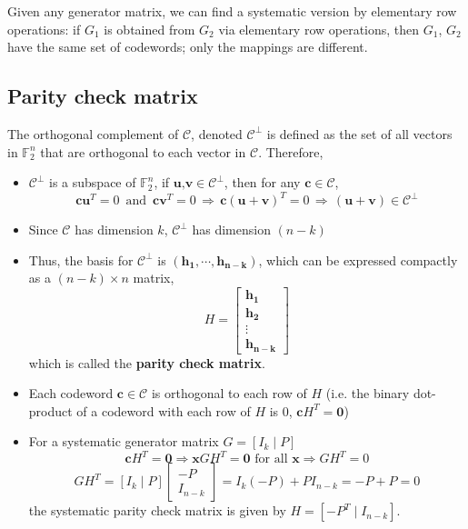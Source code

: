 \documentclass[11pt]{article}
\begin{document}
Given any generator matrix, we can find a systematic version by elementary row operations: if $G_1$ is obtained from $G_2$ via elementary row operations, then
$G_1$, $G_2$ have the same set of codewords; only the mappings are different.

\subsection{Parity check matrix}

The orthogonal complement of $\mathcal{C}$, denoted $\mathcal{C}^\perp$ is defined as the set of all vectors in $\mathbb{F}_2^n$ that are orthogonal to each vector in $\mathcal{C}$. Therefore,
\begin{itemize}
  \item $\mathcal{C}^\perp$ is a subspace of $\mathbb{F}_2^n$, if $\boldsymbol{u} \text{,} \boldsymbol{v} \in \mathcal{C}^\perp$, then for any $\boldsymbol{c} \in \mathcal{C}$,
  \[
  \boldsymbol{c}\boldsymbol{u}^T = 0 \, \text{ and } \, \boldsymbol{c}\boldsymbol{v}^T = 0 \, \Rightarrow \, \boldsymbol{c}(\boldsymbol{u} + \boldsymbol{v})^T = 0 \, \Rightarrow \, (\boldsymbol{u} + \boldsymbol{v}) \in \mathcal{C}^\perp
  \]
  \item Since $\mathcal{C}$ has dimension $k$, $\mathcal{C}^\perp$ has dimension $(n - k)$ 
  \item Thus, the basis for $\mathcal{C}^\perp$ is $(\boldsymbol{h_1}, \cdots, \boldsymbol{h_{n-k}})$, which can be expressed compactly as a $(n-k) \times n$ matrix,
  \[
  H = \left[ \begin{matrix} \boldsymbol{h_1} \\ \boldsymbol{h_2} \\ \vdots \\ \boldsymbol{h_{n-k}} \end{matrix} \right]
  \]
  which is called the \textbf{parity check matrix}.
  \item Each codeword $\boldsymbol{c} \in \mathcal{C}$ is orthogonal to each row of $H$ (i.e. the binary dot-product of a codeword with each row of $H$ is $0$, $\boldsymbol{c} H^T = \boldsymbol{0}$)
  \item For a systematic generator matrix $G = \left[ I_k \mid  P \right]$
  \[
  \boldsymbol{c} H^T = \boldsymbol{0} \Rightarrow \boldsymbol{x} G H^T = \boldsymbol{0} \text{ for all } \boldsymbol{x} \Rightarrow G H^T = 0
  \]
  \[
  GH^T = \left[I_k \mid P\right] \begin{bmatrix} -P \\ I_{n-k} \end{bmatrix} = I_k (-P) + P I_{n-k} = -P + P = 0
  \]
  the systematic parity check matrix is given by $H = \left[ -P^T \mid  I_{n-k} \right]$.
\end{itemize}
\end{document}
